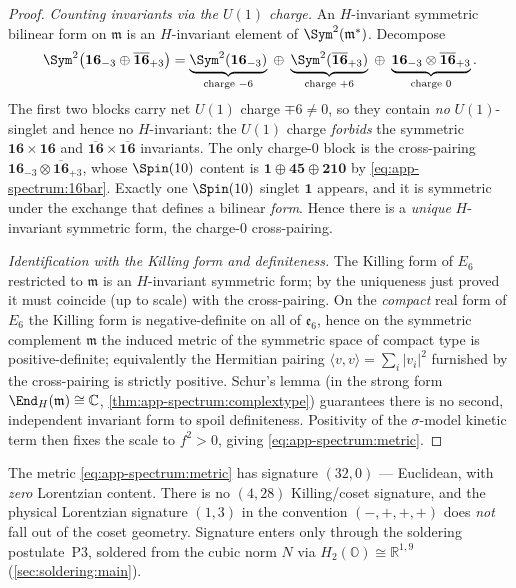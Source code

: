 \begin{proof}
\emph{Counting invariants via the $U(1)$ charge.} An $H$-invariant
symmetric bilinear form on $\mathfrak m$ is an $H$-invariant element of
$\Sym^2(\mathfrak m^\ast)$. Decompose
\[
  \Sym^2\bigl(\mathbf{16}_{-3}\oplus\overline{\mathbf{16}}_{+3}\bigr)
   = \underbrace{\Sym^2(\mathbf{16}_{-3})}_{\text{charge }-6}
   \;\oplus\;
   \underbrace{\Sym^2(\overline{\mathbf{16}}_{+3})}_{\text{charge }+6}
   \;\oplus\;
   \underbrace{\mathbf{16}_{-3}\otimes\overline{\mathbf{16}}_{+3}}_{\text{charge }0}.
\]
The first two blocks carry net $U(1)$ charge $\mp6\neq0$, so they contain
\emph{no} $U(1)$-singlet and hence no $H$-invariant: the $U(1)$ charge
\emph{forbids} the symmetric $\mathbf{16}\times\mathbf{16}$ and
$\overline{\mathbf{16}}\times\overline{\mathbf{16}}$ invariants. The only
charge-$0$ block is the cross-pairing
$\mathbf{16}_{-3}\otimes\overline{\mathbf{16}}_{+3}$, whose $\Spin(10)$
content is $\mathbf 1\oplus\mathbf{45}\oplus\mathbf{210}$ by
\eqref{eq:app-spectrum:16bar}. Exactly one $\Spin(10)$ singlet $\mathbf 1$
appears, and it is symmetric under the exchange that defines a bilinear
\emph{form}. Hence there is a \emph{unique} $H$-invariant symmetric form,
the charge-$0$ cross-pairing.

\emph{Identification with the Killing form and definiteness.} The Killing
form of $E_6$ restricted to $\mathfrak m$ is an $H$-invariant symmetric
form; by the uniqueness just proved it must coincide (up to scale) with
the cross-pairing. On the \emph{compact} real form of $E_6$ the Killing
form is negative-definite on all of $\mathfrak e_6$, hence on the symmetric
complement $\mathfrak m$ the induced metric of the symmetric space of
compact type is positive-definite; equivalently the Hermitian pairing
$\langle v,v\rangle=\sum_i|v_i|^2$ furnished by the cross-pairing is
strictly positive. Schur's lemma (in the strong form
$\End_H(\mathfrak m)\cong\mathbb C$, \autoref{thm:app-spectrum:complextype})
guarantees there is no second, independent invariant form to spoil
definiteness. Positivity of the $\sigma$-model kinetic term then fixes the
scale to $f^2>0$, giving \eqref{eq:app-spectrum:metric}.
\end{proof}

\begin{remark}\label{rem:app-spectrum:nolorentz}
The metric \eqref{eq:app-spectrum:metric} has signature $(32,0)$ ---
Euclidean, with \emph{zero} Lorentzian content. There is no $(4,28)$
Killing/coset signature, and the physical Lorentzian signature $(1,3)$ in
the convention $(-,+,+,+)$ does \emph{not} fall out of the coset geometry.
Signature enters only through the soldering postulate~P3, soldered from the
cubic norm $N$ via $H_2(\mathbb O)\cong\mathbb R^{1,9}$
(\autoref{sec:soldering:main}).
\end{remark}

